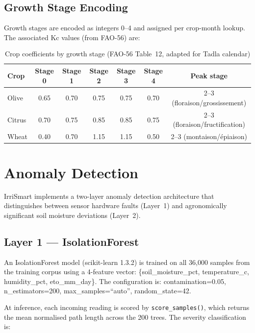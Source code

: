 \documentclass[12pt,a4paper]{report}
\begin{document}
\subsection{Growth Stage Encoding}

Growth stages are encoded as integers 0--4 and assigned per crop-month lookup. The associated Kc values (from FAO-56) are:

\begin{table}[H]
\centering
\caption{Crop coefficients by growth stage (FAO-56 Table~12, adapted for Tadla calendar)}
\label{tab:kc}
\begin{tabular}{lcccccc}
\toprule
\textbf{Crop} & \textbf{Stage 0} & \textbf{Stage 1} & \textbf{Stage 2} & \textbf{Stage 3} & \textbf{Stage 4} & \textbf{Peak stage} \\
\midrule
Olive  & 0.65 & 0.70 & 0.75 & 0.75 & 0.70 & 2--3 (floraison/grossissement) \\
Citrus & 0.70 & 0.75 & 0.85 & 0.85 & 0.75 & 2--3 (floraison/fructification) \\
Wheat  & 0.40 & 0.70 & 1.15 & 1.15 & 0.50 & 2--3 (montaison/épiaison) \\
\bottomrule
\end{tabular}
\end{table}

\section{Anomaly Detection}

IrriSmart implements a two-layer anomaly detection architecture that distinguishes between sensor hardware faults (Layer~1) and agronomically significant soil moisture deviations (Layer~2).

\subsection{Layer 1 --- IsolationForest}

An IsolationForest model (scikit-learn 1.3.2) is trained on all 36,000 samples from the training corpus using a 4-feature vector: \{soil\_moisture\_pct, temperature\_c, humidity\_pct, eto\_mm\_day\}. The configuration is: contamination=0.05, n\_estimators=200, max\_samples=``auto'', random\_state=42.

At inference, each incoming reading is scored by \texttt{score\_samples()}, which returns the mean normalised path length across the 200 trees. The severity classification is:
\end{document}
